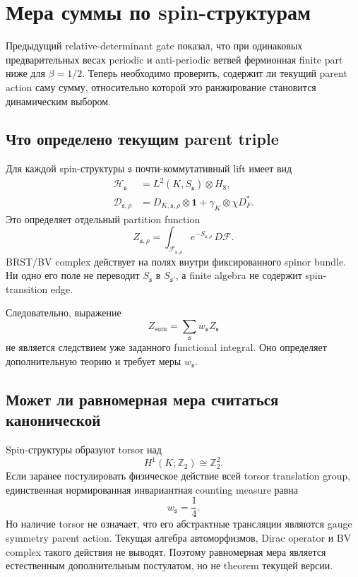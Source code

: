 \chapter{Мера суммы по spin-структурам}

Предыдущий relative-determinant gate показал, что при одинаковых
предварительных весах periodic и anti-periodic ветвей фермионная finite
part ниже для \(\beta=1/2\). Теперь необходимо проверить, содержит ли
текущий parent action саму сумму, относительно которой это ранжирование
становится динамическим выбором.

\section{Что определено текущим parent triple}

Для каждой spin-структуры \(\mathfrak s\) почти-коммутативный lift имеет вид
\begin{align}
 \mathcal H_{\mathfrak s}
 &=L^2(K,S_{\mathfrak s})\otimes H_8,
 \\
 \mathcal D_{\mathfrak s,\rho}
 &=D_{K,\mathfrak s,\rho}\otimes\mathbf1
 +\gamma_K\otimes\chi D_F^*.
\end{align}
Это определяет отдельный partition function
\begin{equation}
 Z_{\mathfrak s,\rho}
 =\int_{\mathcal F_{\mathfrak s,\rho}}
 e^{-S_{\mathfrak s,\rho}}\,D\mathcal F.
\end{equation}
BRST/BV complex действует на полях внутри фиксированного spinor bundle.
Ни одно его поле не переводит \(S_{\mathfrak s}\) в
\(S_{\mathfrak s'}\), а finite algebra не содержит spin-transition edge.

Следовательно, выражение
\begin{equation}
 Z_{\mathrm{sum}}
 =\sum_{\mathfrak s}w_{\mathfrak s}Z_{\mathfrak s}
 \label{eq:spin-sum-partition}
\end{equation}
не является следствием уже заданного functional integral. Оно определяет
дополнительную теорию и требует меры \(w_{\mathfrak s}\).

\section{Может ли равномерная мера считаться канонической}

Spin-структуры образуют torsor над
\begin{equation}
 H^1(K;\mathbb Z_2)\cong\mathbb Z_2^2.
\end{equation}
Если заранее постулировать физическое действие всей torsor translation
group, единственная нормированная инвариантная counting measure равна
\begin{equation}
 w_{\mathfrak s}=\frac14.
\end{equation}
Но наличие torsor не означает, что его абстрактные трансляции являются
gauge symmetry parent action. Текущая алгебра автоморфизмов, Dirac operator
и BV complex такого действия не выводят. Поэтому равномерная мера является
естественным дополнительным постулатом, но не theorem текущей версии.

